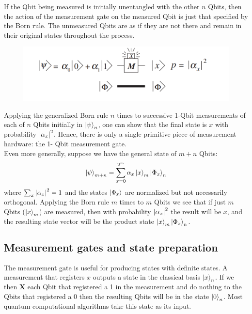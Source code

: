 \documentclass{book}
\theoremstyle{definition}
\newcommand{\X}{\mathbf{X}}
\begin{document}
If the Qbit being measured is initially unentangled with the other $n$ Qbits, then the action of the measurement gate on the measured Qbit is just that specified by the Born rule. The unmeasured Qbits are as if they are not there and remain in their original states throughout the process. 

\begin{figure}[!htb]
	\centering
	\includegraphics[scale=0.25]{measurement1}
\end{figure}

Applying the generalized Born rule $n$ times to successive 1-Qbit measurements of each of $n$ Qbits initially in $\ket{\psi}_n$, one can show that the final state is $x$ with probability $\abs{\alpha_x}^2$.  Hence, there is only a single primitive piece of measurement hardware: the 1-
Qbit measurement gate. \\

Even more generally, suppose we have the general state of $m+n$ Qbits:
\begin{align}
\ket{\psi}_{m+n} = \sum^{2^m}_{x=0}\alpha_x\ket{x}_m\ket{\Phi_x}_n
\end{align}
where $\sum_x\abs{\alpha_x}^2 = 1$ and the states $\ket{\Phi_x}$ are normalized but not necessarily orthogonal. Applying the Born rule $m$ times to $m$ Qbits we see that if just $m$ Qbits ($\ket{x}_m$) are measured, then with probability $\abs{\alpha_x}^2$ the result will be $x$, and the resulting state vector will be the product state $\ket{x}_m\ket{\Phi_x}_n$.


\subsection{Measurement gates and state preparation}

The measurement gate is useful for producing states with definite states. A measurement that registers $x$ outputs a state in the classical basis $\ket{x}_n$. If we then $\X$ each Qbit that registered a 1 in the measurement and do nothing to the Qbits that registered a 0 then the resulting Qbits will be in the state $\ket{0}_n$. Most quantum-computational algorithms take this state as its input. \\
\end{document}
